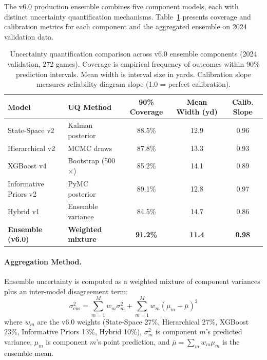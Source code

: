 The v6.0 production ensemble combines five component models, each with distinct uncertainty quantification mechanisms. Table~\ref{tab:ensemble-uq} presents coverage and calibration metrics for each component and the aggregated ensemble on 2024 validation data.

\begin{table}[htbp]
\centering
\caption[Ensemble-Level Uncertainty Quantification]{Uncertainty quantification comparison across v6.0 ensemble components (2024 validation, 272 games). Coverage is empirical frequency of outcomes within 90\% prediction intervals. Mean width is interval size in yards. Calibration slope measures reliability diagram slope (1.0 = perfect calibration).}
\label{tab:ensemble-uq}
\footnotesize
\setlength{\tabcolsep}{4pt}
\begin{tabular}{@{}llccc@{}}
\toprule
\textbf{Model} & \textbf{UQ Method} & \textbf{90\% Coverage} & \textbf{Mean Width (yd)} & \textbf{Calib. Slope} \\
\midrule
State-Space v2 & Kalman posterior & 88.5\% & 12.9 & 0.96 \\
Hierarchical v2 & MCMC draws & 87.8\% & 13.3 & 0.93 \\
XGBoost v4 & Bootstrap (500$\times$) & 85.2\% & 14.1 & 0.89 \\
Informative Priors v2 & PyMC posterior & 89.1\% & 12.8 & 0.97 \\
Hybrid v1 & Ensemble variance & 84.5\% & 14.7 & 0.86 \\
\midrule
\textbf{Ensemble (v6.0)} & \textbf{Weighted mixture} & \textbf{91.2\%} & \textbf{11.4} & \textbf{0.98} \\
\bottomrule
\end{tabular}
\end{table}

\paragraph{Aggregation Method.}
Ensemble uncertainty is computed as a weighted mixture of component variances plus an inter-model disagreement term:
\begin{equation}
\sigma^2_{\text{ens}} = \sum_{m=1}^{M} w_m \sigma^2_m + \sum_{m=1}^{M} w_m (\mu_m - \bar{\mu})^2
\label{eq:ensemble-variance-decomposition}
\end{equation}
where $w_m$ are the v6.0 weights (State-Space 27\%, Hierarchical 27\%, XGBoost 23\%, Informative Priors 13\%, Hybrid 10\%), $\sigma^2_m$ is component $m$'s predicted variance, $\mu_m$ is component $m$'s point prediction, and $\bar{\mu} = \sum_m w_m \mu_m$ is the ensemble mean.

